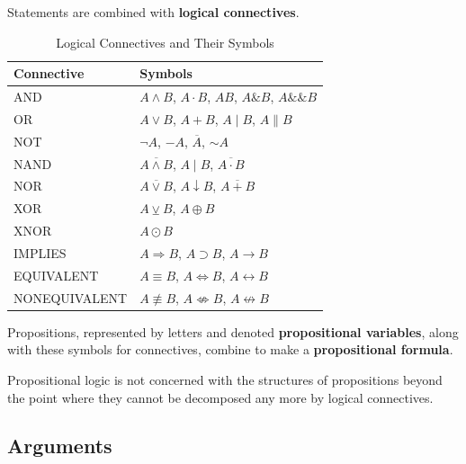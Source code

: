   \begin{definition}[Connectives]
    \label{def:connectives}
    Statements are combined with \textbf{logical connectives}. 
    \begin{table}[H]
      \centering
      \begin{tabular}{|l|l|}
      \hline
      \textbf{Connective} & \textbf{Symbols} \\
      \hline
      AND & $A \wedge B$, $A \cdot B$, $AB$, $A \& B$, $A \&\& B$ \\
      \hline
      OR & $A \vee B$, $A + B$, $A \mid B$, $A \parallel B$ \\
      \hline
      NOT & $\neg A$, $-A$, $\overline{A}$, $\sim A$ \\
      \hline
      NAND & $\overline{A \wedge B}$, $A \mid B$, $\overline{A \cdot B}$ \\
      \hline
      NOR & $\overline{A \vee B}$, $A \downarrow B$, $\overline{A + B}$ \\
      \hline
      XOR & $A \veebar B$, $A \oplus B$ \\
      \hline
      XNOR & $A \odot B$ \\
      \hline
      IMPLIES & $A \Rightarrow B$, $A \supset B$, $A \rightarrow B$ \\
      \hline
      EQUIVALENT & $A \equiv B$, $A \Leftrightarrow B$, $A \leftrightarrow B$ \\
      \hline
      NONEQUIVALENT & $A \not\equiv B$, $A \not\Leftrightarrow B$, $A \not\leftrightarrow B$ \\
      \hline
      \end{tabular}
      \caption{Logical Connectives and Their Symbols}
      \label{tab:logical-connectives}
    \end{table} 
  \end{definition} 

  \begin{definition}
    \label{def:propositional-formula}
    Propositions, represented by letters and denoted \textbf{propositional variables}, along with these symbols for connectives, combine to make a \textbf{propositional formula}. 
  \end{definition}

  Propositional logic is not concerned with the structures of propositions beyond the point where they cannot be decomposed any more by logical connectives. 

\subsection{Arguments}

